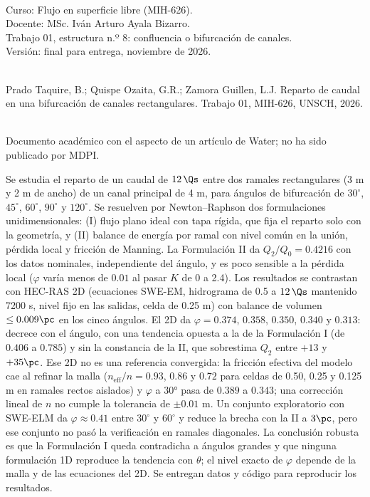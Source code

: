 \noindent\begin{wmeta}
\\
Curso: Flujo en superficie libre (MIH-626).\\
Docente: MSc. Iván Arturo Ayala Bizarro.\\
Trabajo 01, estructura n.º 8: confluencia o bifurcación de canales.\\
Versión: final para entrega, noviembre de 2026.

\\
Prado Taquire, B.; Quispe Ozaita, G.R.; Zamora Guillen, L.J. Reparto de caudal en una bifurcación de canales rectangulares. Trabajo 01, MIH-626, UNSCH, 2026.

\\
Documento académico con el aspecto de un artículo de Water; no ha sido publicado por MDPI.
\end{wmeta}\hfill
\begin{wabstract}
 Se estudia el reparto de un caudal de $12\,\Qs$ entre dos ramales rectangulares (3 m y 2 m de ancho) de un canal principal de 4 m, para ángulos de bifurcación de $30^\circ$, $45^\circ$, $60^\circ$, $90^\circ$ y $120^\circ$. Se resuelven por Newton--Raphson dos formulaciones unidimensionales: (I) flujo plano ideal con tapa rígida, que fija el reparto solo con la geometría, y (II) balance de energía por ramal con nivel común en la unión, pérdida local y fricción de Manning. La Formulación II da $Q_2/Q_0=0.4216$ con los datos nominales, independiente del ángulo, y es poco sensible a la pérdida local ($\varphi$ varía menos de $0.01$ al pasar $K$ de 0 a 2.4). Los resultados se contrastan con HEC-RAS 2D (ecuaciones SWE-EM, hidrograma de 0.5 a $12\,\Qs$ mantenido 7200 s, nivel fijo en las salidas, celda de 0.25 m) con balance de volumen $\leq0.009\pc$ en los cinco ángulos. El 2D da $\varphi=0.374$, $0.358$, $0.350$, $0.340$ y $0.313$: decrece con el ángulo, con una tendencia opuesta a la de la Formulación I (de $0.406$ a $0.785$) y sin la constancia de la II, que sobrestima $Q_2$ entre $+13$ y $+35\pc$. Ese 2D no es una referencia convergida: la fricción efectiva del modelo cae al refinar la malla ($n_\mathrm{eff}/n=0.93$, $0.86$ y $0.72$ para celdas de 0.50, 0.25 y 0.125 m en ramales rectos aislados) y $\varphi$ a 30° pasa de $0.389$ a $0.343$; una corrección lineal de $n$ no cumple la tolerancia de $\pm0.01$ m. Un conjunto exploratorio con SWE-ELM da $\varphi\approx0.41$ entre $30^\circ$ y $60^\circ$ y reduce la brecha con la II a $3\pc$, pero ese conjunto no pasó la verificación en ramales diagonales. La conclusión robusta es que la Formulación I queda contradicha a ángulos grandes y que ninguna formulación 1D reproduce la tendencia con $\theta$; el nivel exacto de $\varphi$ depende de la malla y de las ecuaciones del 2D. Se entregan datos y código para reproducir los resultados.
\end{wabstract}
\vspace{6pt}{\color{wgrey}\rule{\textwidth}{0.5pt}}
